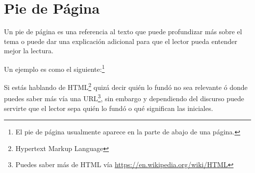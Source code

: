 \section{Pie de Página}

Un pie de página es una referencia al texto que puede profundizar más sobre el tema o puede dar una explicación adicional para que el lector
pueda entender mejor la lectura.

Un ejemplo es como el siguiente:\footnote{El pie de página usualmente aparece en la parte de abajo de una página.}

Si estás hablando de HTML\footnote{Hypertext Markup Language} quizá decir quién lo fundó no sea relevante ó donde puedes saber más vía una URL\footnote{Puedes saber más de HTML vía \url{https://en.wikipedia.org/wiki/HTML}}, sin embargo y dependiendo del discurso puede servirte que el lector sepa quién lo fundó 
o qué significan las iniciales.